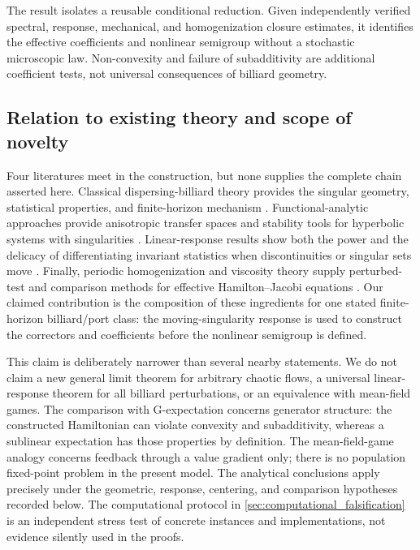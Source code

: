 \documentclass[12pt, letterpaper]{amsart}
\theoremstyle{plain}
\theoremstyle{definition}
\theoremstyle{remark}
\begin{document}
The result isolates a reusable conditional reduction. Given independently
verified spectral, response, mechanical, and homogenization closure estimates,
it identifies the effective coefficients and nonlinear semigroup without a
stochastic microscopic law. Non-convexity and failure of subadditivity are
additional coefficient tests, not universal consequences of billiard geometry.

\subsection{Relation to existing theory and scope of novelty}

Four literatures meet in the construction, but none supplies the complete chain asserted here.  Classical dispersing-billiard theory provides the singular geometry, statistical properties, and finite-horizon mechanism \citep{Sinai1970,KatokStrelcyn1986,chernov2006chaotic,ChernovZhang2009}.  Functional-analytic approaches provide anisotropic transfer spaces and stability tools for hyperbolic systems with singularities \citep{GouezelLiverani2006,DemersLiverani2008,DemersZhang2011,DemersZhang2013,BaladiDemersLiverani2018}.  Linear-response results show both the power and the delicacy of differentiating invariant statistics when discontinuities or singular sets move \citep{BaladiSmania2008,Wormell2024PiecewiseResponse}.  Finally, periodic homogenization and viscosity theory supply perturbed-test and comparison methods for effective Hamilton--Jacobi equations \citep{BensoussanLionsPapanicolaou1978,Evans1992,CrandallIshiiLions1992,BarlesSouganidis1991}.  Our claimed contribution is the composition of these ingredients for one stated finite-horizon billiard/port class: the moving-singularity response is used to construct the correctors and coefficients before the nonlinear semigroup is defined.

This claim is deliberately narrower than several nearby statements.  We do not claim a new general limit theorem for arbitrary chaotic flows, a universal linear-response theorem for all billiard perturbations, or an equivalence with mean-field games.  The comparison with G-expectation concerns generator structure: the constructed Hamiltonian can violate convexity and subadditivity, whereas a sublinear expectation has those properties by definition.  The mean-field-game analogy concerns feedback through a value gradient only; there is no population fixed-point problem in the present model.  The analytical conclusions apply precisely under the geometric, response, centering, and comparison hypotheses recorded below.  The computational protocol in \cref{sec:computational_falsification} is an independent stress test of concrete instances and implementations, not evidence silently used in the proofs.
\end{document}
